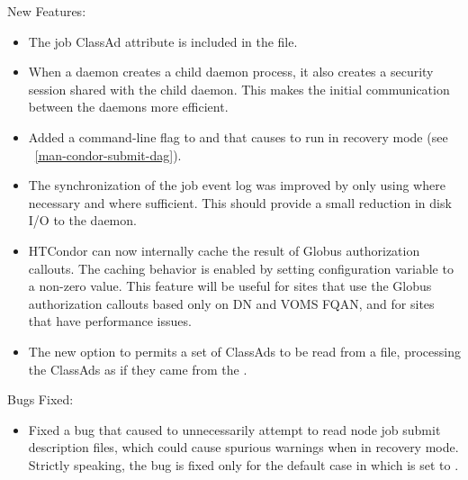 \noindent New Features:

\begin{itemize}

\item The job ClassAd attribute  is included in 
the  file.

\item When a daemon creates a child daemon process, it also creates a
security session shared with the child daemon.
This makes the initial communication between the daemons more efficient.

\item Added a  command-line flag to 
and  that causes  to run in
recovery mode (see ~\ref{man-condor-submit-dag}).

\item The synchronization of the job event log was improved by only
using  where necessary and 
 where sufficient.  
This should provide a small reduction in disk I/O to 
the  daemon.

\item HTCondor can now internally cache the result of Globus authorization
callouts.  
The caching behavior is enabled by setting configuration variable
 to a non-zero value.
This feature will be useful for sites that use the Globus authorization
callouts based only on DN and VOMS FQAN, and for sites that have 
performance issues.

\item The new  option to  permits a set of ClassAds
to be read from a file, processing the ClassAds as if they came from
the .

\end{itemize}

\noindent Bugs Fixed:

\begin{itemize}

\item Fixed a bug that caused  to unnecessarily attempt
to read node job submit description files, 
which could cause spurious warnings when in recovery mode.
Strictly speaking, the bug is fixed only for the
default case in which  is set
to .

\end{itemize}

